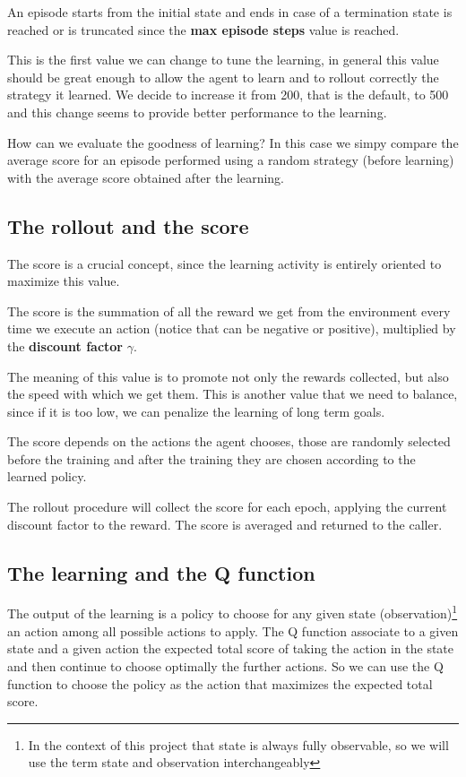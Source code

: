 \documentclass{article}
\begin{document}
An episode starts from the initial state and ends in case of a termination state is reached or 
is truncated since the \textbf{max episode steps} value is reached.

This is the first value we can change to tune the learning, in general this value should be 
great enough to allow the agent to learn and to rollout correctly the strategy it learned.
We decide to increase it from 200, that is the default, to 500 and this change seems to 
provide better performance to the learning.

How can we evaluate the goodness of learning? In this case we simpy compare the average score for an episode 
performed using a random strategy (before learning) with the average score obtained after the learning.

\subsection{The rollout and the score}

The score is a crucial concept, since the learning activity is entirely oriented to maximize this value.

The score is the summation of all the reward we get from the environment every time we execute an action 
(notice that can be negative or positive),
multiplied by the \textbf{discount factor} $\gamma$.

The meaning of this value is to promote not only the rewards collected, but also the speed with which we get them.
This is another value that we need to balance, since if it is too low, we can penalize the learning of long term goals.

The score depends on the actions the agent chooses, those are randomly selected before the training 
and after the training they are chosen according to the learned policy.

The rollout procedure will collect the score for each epoch, applying the current discount factor to the reward.
The score is averaged and returned to the caller.

\subsection{The learning and the Q function}

The output of the learning is a policy to choose for any given state (observation)\footnote[2]{
In the context of this project that state is always fully observable, so we will use the term state 
and observation interchangeably} an action among all possible actions to apply.
The Q function associate to a given state and a given action the expected total score of taking the action in the state 
and then continue to choose optimally the further actions.
So we can use the Q function to choose the policy as the action that maximizes the expected total score.
\end{document}
